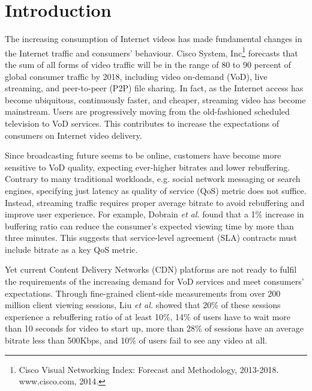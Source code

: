 \section{Introduction}

The increasing consumption of Internet videos has made fundamental changes in the Internet traffic and consumers' behaviour. Cisco System, Inc\footnote{Cisco Visual Networking Index: Forecast and Methodology, 2013-2018. www.cisco.com, 2014.} forecasts that the sum of all forms of video traffic will be in the range of 80 to 90 percent of global consumer traffic by 2018, including video on-demand (VoD), live streaming, and peer-to-peer (P2P) file sharing. In fact, as the Internet access has become ubiquitous, continuously faster, and cheaper, streaming video has become mainstream. Users are progressively moving from the old-fashioned scheduled television to VoD services. This contributes to increase the expectations of consumers on Internet video delivery. 

Since broadcasting future seems to be online, customers have become more sensitive to VoD quality, expecting ever-higher bitrates and lower rebuffering. Contrary to many traditional workloads, e.g. social network messaging or search engines, specifying just latency as quality of service (QoS) metric does not suffice. Instead, streaming traffic requires proper average bitrate to avoid rebuffering and improve user experience. For example, Dobrain \emph{et al.}\cite{Dobrian_sigcomm_2011} found that a 1\% increase in buffering ratio can reduce the consumer's expected viewing time by more than three minutes. This suggests that service-level agreement (SLA) contracts must include bitrate as a key QoS metric. 

Yet current Content Delivery Networks (CDN) platforms are not ready to fulfil the requirements of the increasing demand for VoD services and meet consumers' expectations. Through fine-grained client-side measurements from over 200 million client viewing sessions, Liu \emph{et al.}\cite{Liu_sigcomm_2012} showed that 20\% of these sessions experience a rebuffering ratio of at least 10\%, 14\% of users have to wait more than 10 seconds for video to start up, more than 28\% of sessions have an average bitrate less than 500Kbps, and 10\% of users fail to see any video at all.

